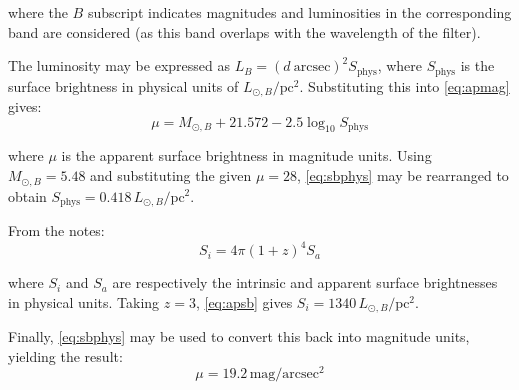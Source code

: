\documentclass{article}
\begin{document}
where the $B$ subscript indicates magnitudes and luminosities in the corresponding band are considered (as this band overlaps with the wavelength of the filter).

The luminosity may be expressed as $L_B=(d\ \mathrm{arcsec})^2S_{\mathrm{phys}}$, where $S_{\mathrm{phys}}$ is the surface brightness in physical units of $L_{\odot,B}/\mathrm{pc}^2$. Substituting this into \cref{eq:apmag} gives:
\begin{equation}
  \label{eq:sbphys}
  \mu=M_{\odot,B}+21.572-2.5\log_{10}S_{\mathrm{phys}}
\end{equation}

where $\mu$ is the apparent surface brightness in magnitude units. Using $M_{\odot,B}=5.48$ and substituting the given $\mu=28$, \cref{eq:sbphys} may be rearranged to obtain $S_\mathrm{phys}=0.418\,L_{\odot,B}/\mathrm{pc^2}$.

From the notes:
\begin{equation}
  \label{eq:apsb}
  S_i=4\pi(1+z)^4S_a
\end{equation}

where $S_i$ and $S_a$ are respectively the intrinsic and apparent surface brightnesses in physical units. Taking $z=3$, \cref{eq:apsb} gives $S_i=1340\,L_{\odot,B}/\mathrm{pc^2}$.

Finally, \cref{eq:sbphys} may be used to convert this back into magnitude units, yielding the result: $$\mu=19.2\,\mathrm{mag/arcsec^2}$$
\end{document}
